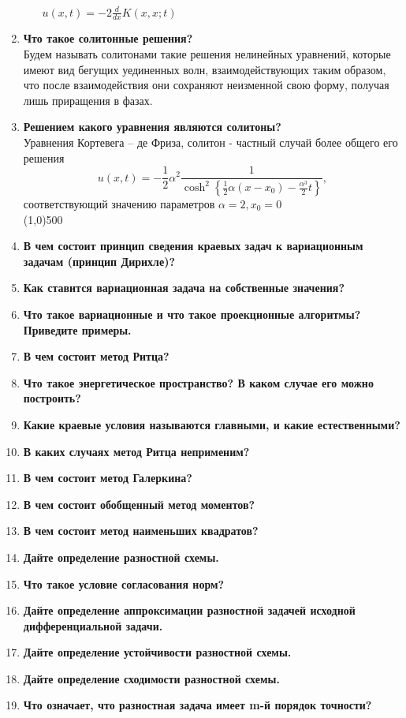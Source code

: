 \begin{enumerate}[label=\textbf{\underline{\arabic*.}}]
\begin{enumerate}
            $u(x,t)=-2\frac{d}{dx}K(x,x;t)$
      \end{enumerate}
\item \textbf{Что такое солитонные решения?}\\
      Будем называть солитонами такие решения нелинейных уравнений, которые имеют вид бегущих уединенных волн, взаимодействующих таким образом, что после взаимодействия они сохраняют неизменной свою форму, получая лишь приращения в фазах.
\item \textbf{Решением какого уравнения являются солитоны?}\\
	Уравнения Кортевега -- де Фриза, солитон - частный случай более общего его решения
      $$u(x,t)=-\frac1{2}\alpha^2\frac1{\cosh^2\left\{\frac1{2}\alpha(x-x_0)-\frac{\alpha^3}{2}t \right\}}, $$
      соответствующий значению параметров $\alpha=2, x_0=0 $
\\\line(1,0){500}
\item \textbf{В чем состоит принцип сведения краевых задач к вариационным задачам (принцип Дирихле)?}
\item \textbf{Как ставится вариационная задача на собственные значения?}
\item \textbf{Что такое вариационные и что такое проекционные алгоритмы? Приведите примеры.}
\item \textbf{В чем состоит метод Ритца?}
\item \textbf{Что такое энергетическое пространство? В каком случае его можно построить?}
\item \textbf{Какие краевые условия называются главными, и какие естественными?}
\item \textbf{В каких случаях метод Ритца неприменим?}
\item \textbf{В чем состоит метод Галеркина?}
\item \textbf{В чем состоит обобщенный метод моментов?}
\item \textbf{В чем состоит метод наименьших квадратов?}
\item \textbf{Дайте определение разностной схемы.}
\item \textbf{Что такое условие согласования норм?}
\item \textbf{Дайте определение аппроксимации разностной задачей исходной дифференциальной задачи.}
\item \textbf{Дайте определение устойчивости разностной схемы.}
\item \textbf{Дайте определение сходимости разностной схемы.}
\item \textbf{Что означает, что разностная задача имеет m-й порядок точности?}

\end{enumerate}

